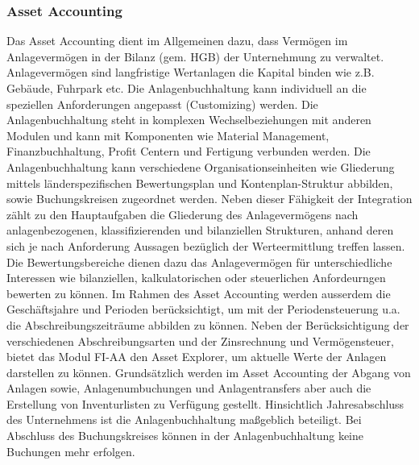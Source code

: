 \subsubsection{Asset Accounting} %
Das Asset Accounting dient im Allgemeinen dazu, dass Vermögen im Anlagevermögen in der Bilanz (gem. HGB) der Unternehmung zu verwaltet. Anlagevermögen sind langfristige Wertanlagen die Kapital binden wie z.B. Gebäude, Fuhrpark etc. Die Anlagenbuchhaltung kann individuell an die speziellen Anforderungen angepasst (Customizing) werden. 
Die Anlagenbuchhaltung steht in komplexen Wechselbeziehungen mit anderen Modulen und kann mit Komponenten wie Material Management, Finanzbuchhaltung, Profit Centern und Fertigung verbunden werden. Die Anlagenbuchhaltung kann verschiedene Organisationseinheiten wie Gliederung mittels länderspezifischen Bewertungsplan und Kontenplan-Struktur abbilden, sowie Buchungskreisen zugeordnet werden.
Neben dieser Fähigkeit der Integration zählt zu den Hauptaufgaben die Gliederung des Anlagevermögens nach anlagenbezogenen, klassifizierenden und bilanziellen Strukturen, anhand deren sich je nach Anforderung Aussagen bezüglich der Werteermittlung treffen lassen. Die Bewertungsbereiche dienen dazu das Anlagevermögen für unterschiedliche Interessen wie bilanziellen, kalkulatorischen oder steuerlichen Anfordeurngen bewerten zu können.
Im Rahmen des Asset Accounting werden ausserdem die Geschäftsjahre und Perioden berücksichtigt, um mit der Periodensteuerung u.a. die Abschreibungszeiträume abbilden zu können. Neben der Berücksichtigung der verschiedenen Abschreibungsarten und der Zinsrechnung und Vermögensteuer, bietet das Modul FI-AA den Asset Explorer, um aktuelle Werte der Anlagen darstellen zu können. Grundsätzlich werden im Asset Accounting der Abgang von Anlagen sowie, Anlagenumbuchungen und Anlagentransfers aber auch die Erstellung von Inventurlisten zu Verfügung gestellt. 
Hinsichtlich Jahresabschluss des Unternehmens ist die Anlagenbuchhaltung maßgeblich beteiligt. Bei Abschluss des Buchungskreises können in der Anlagenbuchhaltung keine Buchungen mehr erfolgen.




